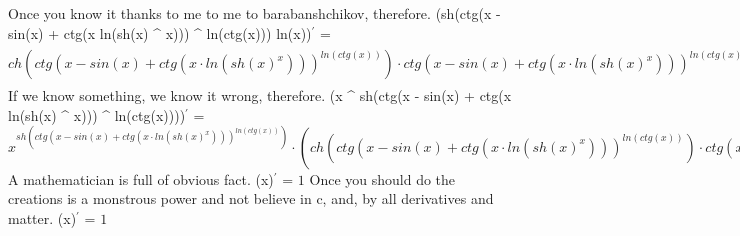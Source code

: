 \documentclass{article}
\begin{document}
{\large Once you know it thanks to me to me to barabanshchikov, therefore. 
\newline\newline
(sh(ctg(x - sin(x) + ctg(x \cdot ln(sh(x) ^ {x}))) ^ {ln(ctg(x))}) \cdot ln(x))$^{'}$ = $ch(ctg(x - sin(x) + ctg(x \cdot ln(sh(x) ^ {x}))) ^ {ln(ctg(x))}) \cdot ctg(x - sin(x) + ctg(x \cdot ln(sh(x) ^ {x}))) ^ {ln(ctg(x))} \cdot (\frac{1}{ctg(x)} \cdot \frac{-1}{sin(x) ^ {2}} \cdot 1 \cdot ln(ctg(x - sin(x) + ctg(x \cdot ln(sh(x) ^ {x})))) + ln(ctg(x)) \cdot \frac{1}{ctg(x - sin(x) + ctg(x \cdot ln(sh(x) ^ {x})))} \cdot \frac{-1}{sin(x - sin(x) + ctg(x \cdot ln(sh(x) ^ {x}))) ^ {2}} \cdot (1 - cos(x) \cdot 1 + \frac{-1}{sin(x \cdot ln(sh(x) ^ {x})) ^ {2}} \cdot (1 \cdot ln(sh(x) ^ {x}) + x \cdot \frac{1}{sh(x) ^ {x}} \cdot sh(x) ^ {x} \cdot (1 \cdot ln(sh(x)) + x \cdot \frac{1}{sh(x)} \cdot ch(x) \cdot 1)))) \cdot ln(x) + sh(ctg(x - sin(x) + ctg(x \cdot ln(sh(x) ^ {x}))) ^ {ln(ctg(x))}) \cdot \frac{1}{x} \cdot 1$} \newline\newline
{\large If we know something, we know it wrong, therefore. 
\newline\newline
(x ^ {sh(ctg(x - sin(x) + ctg(x \cdot ln(sh(x) ^ {x}))) ^ {ln(ctg(x))})})$^{'}$ = $x ^ {sh(ctg(x - sin(x) + ctg(x \cdot ln(sh(x) ^ {x}))) ^ {ln(ctg(x))})} \cdot (ch(ctg(x - sin(x) + ctg(x \cdot ln(sh(x) ^ {x}))) ^ {ln(ctg(x))}) \cdot ctg(x - sin(x) + ctg(x \cdot ln(sh(x) ^ {x}))) ^ {ln(ctg(x))} \cdot (\frac{1}{ctg(x)} \cdot \frac{-1}{sin(x) ^ {2}} \cdot 1 \cdot ln(ctg(x - sin(x) + ctg(x \cdot ln(sh(x) ^ {x})))) + ln(ctg(x)) \cdot \frac{1}{ctg(x - sin(x) + ctg(x \cdot ln(sh(x) ^ {x})))} \cdot \frac{-1}{sin(x - sin(x) + ctg(x \cdot ln(sh(x) ^ {x}))) ^ {2}} \cdot (1 - cos(x) \cdot 1 + \frac{-1}{sin(x \cdot ln(sh(x) ^ {x})) ^ {2}} \cdot (1 \cdot ln(sh(x) ^ {x}) + x \cdot \frac{1}{sh(x) ^ {x}} \cdot sh(x) ^ {x} \cdot (1 \cdot ln(sh(x)) + x \cdot \frac{1}{sh(x)} \cdot ch(x) \cdot 1)))) \cdot ln(x) + sh(ctg(x - sin(x) + ctg(x \cdot ln(sh(x) ^ {x}))) ^ {ln(ctg(x))}) \cdot \frac{1}{x} \cdot 1)$} \newline\newline
{\large A mathematician is full of obvious fact. 
\newline\newline
(x)$^{'}$ = $1$} \newline\newline
{\large Once you should do the creations is a monstrous power and not believe in c, and, by all derivatives and matter. 
\newline\newline
(x)$^{'}$ = $1$} \newline\newline
\end{document}

